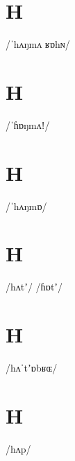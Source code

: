\documentclass[10pt,a4paper,twoside]{book}
\begin{document}
\section*{H}

\begin{multicols}{3}
 {/ˈhʌŋmʌ ʁɒhɴ/} {}
\end{multicols}

\section*{H}

\begin{multicols}{3}
 {/ˈɦɒŋmʌǃ/} {}
\end{multicols}

\section*{H}

\begin{multicols}{3}
 {/ˈhʌŋmɒ/} {}
\end{multicols}

\section*{H}

\begin{multicols}{3}
 {/hʌtʼ/} {}
 {/ɦɒtʼ/} {}
\end{multicols}

\section*{H}

\begin{multicols}{3}
 {/hʌˈtʼɒbʁɶ/} {}
\end{multicols}

\section*{H}

\begin{multicols}{3}
 {/hʌp/} {}
\end{multicols}
\end{document}
